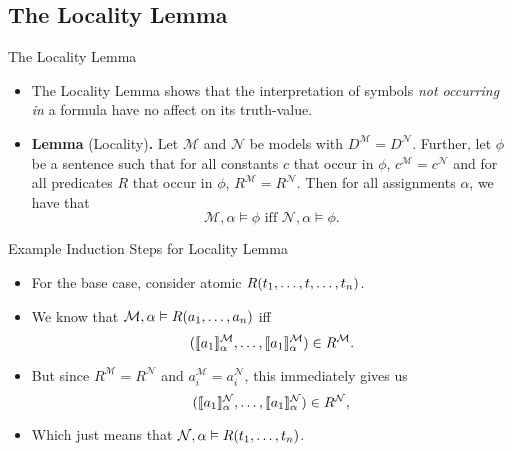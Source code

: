 \subsection{The Locality Lemma}
\begin{frame}{The Locality Lemma}

\begin{itemize}%
\itemsep=16pt

              \item The Locality Lemma shows that the interpretation of symbols \emph{not occurring in} a formula have no affect on its truth-value.
  
  \item \textbf{Lemma} (Locality)\textbf{.} Let $\mathcal{M}$ and
    $\mathcal{N}$ be models with 
              $D^\mathcal{M}=D^\mathcal{N}$. Further, let $\phi$ be
              a sentence such that for all constants $c$ that occur in
              $\phi$, $c^\mathcal{M}=c^\mathcal{N}$ and for all
              predicates $R$ that occur in $\phi$,
              $R^\mathcal{M}=R^\mathcal{N}$. Then for all assignments
              $\alpha$, we have that \[\mathcal{M},\alpha\vDash
                \phi\text{ iff }\mathcal{N},\alpha\vDash\phi.\]
            
\end{itemize}
  
\end{frame}

\begin{frame}{Example Induction Steps for Locality Lemma}

  \begin{itemize}
  \itemsep=16pt

	\item For the base case, consider atomic $R(t_1, \mathellipsis, t, \mathellipsis, t_n)$.

        \item We know that $\mathcal{M},\alpha\vDash
          R(a_1,\mathellipsis, a_n)$ iff \[(\llbracket
                  a_1\rrbracket_\alpha^\mathcal{M}, \mathellipsis,
                  \llbracket a_1\rrbracket_\alpha^\mathcal{M}) \in
                  R^\mathcal{M}.\]
                  \item But since $R^\mathcal{M}=R^\mathcal{N}$ and
                    $a_i^\mathcal{M}=a_i^\mathcal{N}$, this immediately
                    gives us \[(\llbracket
                  a_1\rrbracket_\alpha^\mathcal{N}, \mathellipsis,
                  \llbracket a_1\rrbracket_\alpha^\mathcal{N}) \in
                  R^\mathcal{N},\] 
	
	\item Which just means that $\mathcal{N},\alpha\vDash R(t_1, \mathellipsis, t_n)$.
  \end{itemize}
  
\end{frame}


